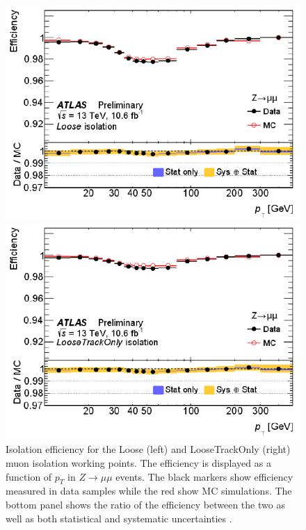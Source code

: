 \begin{figure}[!h]
  \centering
  \begin{minipage}[b]{0.47\textwidth}
    \includegraphics[width=\textwidth]{Pictures/isolationefficiency1.png}
  \end{minipage}
  \hspace{.2cm}
  \begin{minipage}[b]{0.48\textwidth}
    \includegraphics[width=\textwidth]{Pictures/isolationefficiency2.png}
  \end{minipage}
  \caption{Isolation efficiency for the Loose (left) and LooseTrackOnly (right) muon isolation working points. The efficiency is displayed as a function of $p_T$ in $Z \rightarrow \mu\mu$ events. The black markers show efficiency measured in data samples while the red show MC simulations. The bottom panel shows the ratio of the efficiency between the two as well as both  statistical and systematic uncertainties \cite{MCPpaper}.}
  \label{fig:isolation}
\end{figure}


